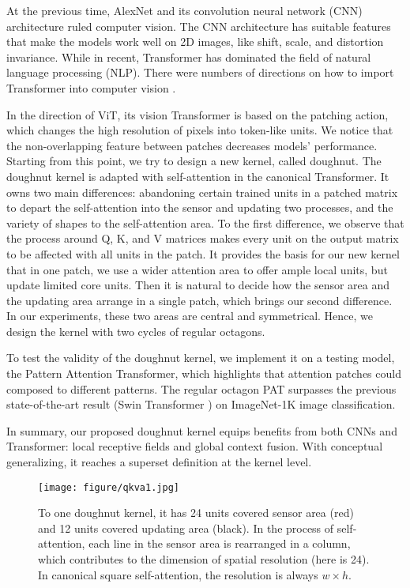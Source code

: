 \documentclass{article}
\theoremstyle{plain}
\theoremstyle{definition}
\theoremstyle{remark}
\begin{document}
At the previous time, AlexNet \cite{krizhevsky2012imagenet} and its convolution neural network (CNN) architecture ruled computer vision. The CNN architecture has suitable features that make the models work well on 2D images, like shift, scale, and distortion invariance. While in recent, Transformer \cite{vaswani2017attention} has dominated the field of natural language processing (NLP). There were numbers of directions on how to import Transformer into computer vision \cite{carion2020end,wu2021cvt}.

In the direction of ViT, its vision Transformer is based on the patching action, which changes the high resolution of pixels into token-like units. We notice that the non-overlapping feature between patches decreases models' performance. Starting from this point, we try to design a new kernel, called doughnut. The doughnut kernel is adapted with self-attention in the canonical Transformer. It owns two main differences: abandoning certain trained units in a patched matrix to depart the self-attention into the sensor and updating two processes, and the variety of shapes to the self-attention area. To the first difference, we observe that the process around Q, K, and V matrices makes every unit on the output matrix to be affected with all units in the patch. It provides the basis for our new kernel that in one patch, we use a wider attention area to offer ample local units, but update limited core units. Then it is natural to decide how the sensor area and the updating area arrange in a single patch, which brings our second difference. In our experiments, these two areas are central and symmetrical. Hence, we design the kernel with two cycles of regular octagons. 

To test the validity of the doughnut kernel, we implement it on a testing model, the Pattern Attention Transformer, which highlights that attention patches could composed to different patterns. The regular octagon PAT surpasses the previous state-of-the-art result (Swin Transformer \cite{liu2021swin}) on ImageNet-1K image classification. 

In summary, our proposed doughnut kernel equips benefits from both CNNs and Transformer: local receptive fields and global context fusion. With conceptual generalizing, it reaches a superset definition at the kernel level.


\begin{figure*}[ht]
\vskip 0.15in
\centering
    \texttt{[image: figure/qkva1.jpg]}
\caption{To one doughnut kernel, it has 24 units covered sensor area (red) and 12 units covered updating area (black). In the process of self-attention, each line in the sensor area is rearranged in a column, which contributes to the dimension of spatial resolution (here is 24). In canonical square self-attention, the resolution is always $w{\times}h$.}
\label{fig:qkva}
\vskip 0.1in
\end{figure*}
\end{document}
